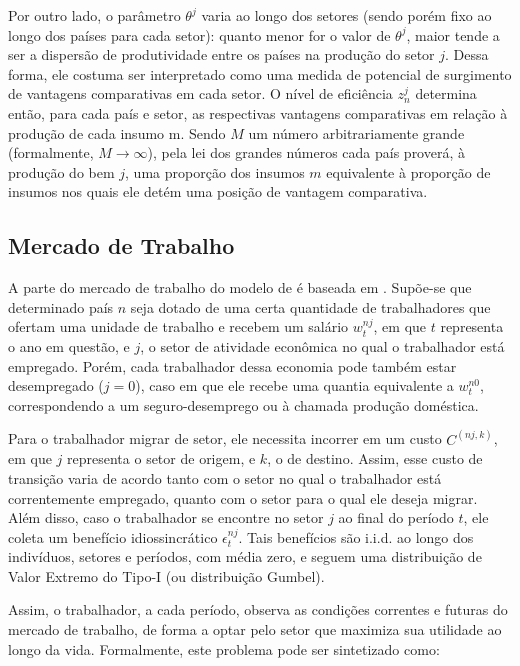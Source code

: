 \documentclass{article}
\begin{document}
Por outro lado, o parâmetro $\theta^j$ varia ao longo dos setores (sendo porém fixo ao longo dos países para cada setor): quanto menor for o valor de $\theta^j$, maior tende a ser a dispersão de produtividade entre os países na produção do setor $j$. Dessa forma, ele costuma ser interpretado como uma medida de potencial de surgimento de vantagens comparativas em cada setor.
O nível de eficiência $z_n^j$ determina então, para cada país e setor, as respectivas vantagens comparativas em relação à produção de cada insumo m. Sendo $M$ um número arbitrariamente grande (formalmente, $M \to \infty$), %
pela lei dos grandes números cada país proverá, à produção do bem $j$, uma proporção dos insumos $m$ equivalente à proporção de insumos nos quais ele detém uma posição de vantagem comparativa.

\subsection{Mercado de Trabalho}

A parte do mercado de trabalho do modelo de \textcite{caliendo} é baseada em \textcite{artuc}. Supõe-se que determinado país $n$ seja dotado de uma certa quantidade de trabalhadores que ofertam uma unidade de trabalho e recebem um salário $w_t^{nj}$, em que $t$ representa o ano em questão, e $j$, o setor de atividade econômica no qual o trabalhador está empregado. Porém, cada trabalhador dessa economia pode também estar desempregado ($j=0$), caso em que ele recebe uma quantia equivalente a $w_t^{n0}$, correspondendo a um seguro-desemprego ou à chamada produção doméstica.

Para o trabalhador migrar de setor, ele necessita incorrer em um custo $C^{(nj,k)}$, em que $j$ representa o setor de origem, e $k$, o de destino. Assim, esse custo de transição varia de acordo tanto com o setor no qual o trabalhador está correntemente empregado, quanto com o setor para o qual ele deseja migrar. Além disso, caso o trabalhador se encontre no setor $j$ ao final do período $t$, ele coleta um benefício idiossincrático $\epsilon_t^{nj}$. Tais benefícios são i.i.d. ao longo dos indivíduos, setores e períodos, com média zero, e seguem uma distribuição de Valor Extremo do Tipo-I (ou distribuição Gumbel).

Assim, o trabalhador, a cada período, observa as condições correntes e futuras do mercado de trabalho, de forma a optar pelo setor que maximiza sua utilidade ao longo da vida. Formalmente, este problema pode ser sintetizado como:
\end{document}
